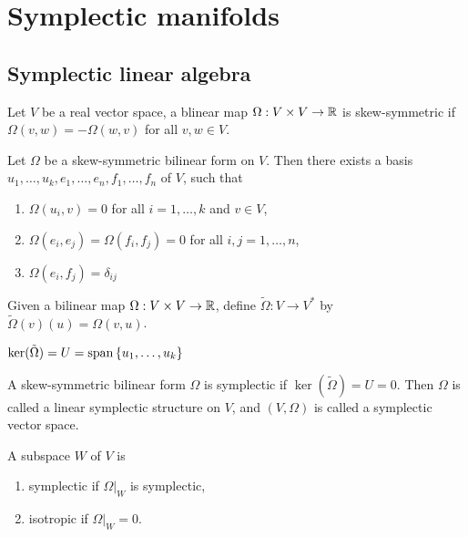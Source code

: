 \section{Symplectic manifolds}

\subsection{Symplectic linear algebra}

\begin{definition}
     Let \(V\) be a real vector space, a blinear map \(\Omega : V \times V \to \mathbb{R}\) is skew-symmetric if \(\Omega(v, w) = -\Omega(w, v)\) for all \(v, w \in V\).
\end{definition}

\begin{theorem}
    Let \(\Omega\) be a skew-symmetric bilinear form on \(V\). Then there exists a basis \(u_1, \dots, u_k, e_1,\dots, e_n, f_1, \dots, f_n\) of \(V\), such that

    \begin{enumerate}
        \item \(\Omega(u_i, v) = 0\) for all \(i = 1, \dots, k\) and \(v \in V\),
        \item \(\Omega(e_i, e_j) = \Omega(f_i, f_j) = 0\) for all \(i, j = 1, \dots, n\),
        \item \(\Omega(e_i, f_j) = \delta_{ij}\)
    \end{enumerate}
\end{theorem}

\begin{definition}
     Given a bilinear map \(\Omega : V \times V \to \mathbb{R}\), define \(\tilde\Omega : V \to V^*\) by \(\tilde\Omega(v)(u) = \Omega(v, u)\).
\end{definition}

\begin{lemma}
    \(\ker(\tilde\Omega) = U = \operatorname{span} \left\{u_1, \dots, u_k\right\}\)
\end{lemma}

\begin{definition}
    [symplectic] A skew-symmetric bilinear form \(\Omega\) is symplectic if \(\ker(\tilde\Omega) = U = 0\). Then \(\Omega\) is called a linear symplectic structure on \(V\), and \((V, \Omega)\) is called a symplectic vector space.
\end{definition}

\begin{definition}
     A subspace \(W\) of \(V\) is

    \begin{enumerate}
        \item symplectic if \(\Omega\vert_W\) is symplectic,
        \item isotropic if \(\Omega\vert_W = 0\).
    \end{enumerate}
\end{definition}

